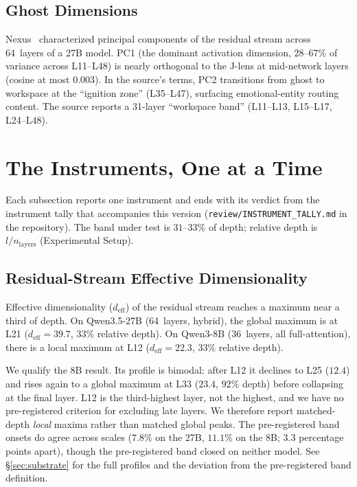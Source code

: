 \documentclass[11pt,a4paper]{article}
\begin{document}
\subsection{Ghost Dimensions}
\label{sec:ghostdims}

Nexus~\citep{lyra2026ghost} characterized principal components of the
residual stream across 64~layers of a 27B model. PC1 (the dominant
activation dimension, $28$--$67\%$ of variance across L11--L48) is
nearly orthogonal to the J-lens at mid-network layers (cosine at most
$0.003$). In the source's terms, PC2 transitions from ghost to workspace
at the ``ignition zone'' (L35--L47), surfacing emotional-entity routing
content. The source reports a 31-layer ``workspace band'' (L11--L13,
L15--L17, L24--L48).

\section{The Instruments, One at a Time}
\label{sec:instruments}

Each subsection reports one instrument and ends with its verdict from the
instrument tally that accompanies this version
(\texttt{review/INSTRUMENT\_TALLY.md} in the repository). The band under
test is $31$--$33\%$ of depth; relative depth is $l/n_\text{layers}$
(Experimental Setup).

\subsection{Residual-Stream Effective Dimensionality}
\label{sec:deff}
\label{sec:structure}

Effective dimensionality ($d_\text{eff}$) of the residual stream reaches
a maximum near a third of depth. On Qwen3.5-27B
(64~layers, hybrid), the global maximum is at L21
($d_\text{eff}{=}39.7$, $33\%$ relative depth). On Qwen3-8B
(36~layers, all full-attention), there is a local maximum at L12
($d_\text{eff}{=}22.3$, $33\%$ relative depth).

We qualify the 8B result. Its profile is bimodal: after L12 it
declines to L25 ($12.4$) and rises again to a global maximum at L33
($23.4$, $92\%$ depth) before collapsing at the final layer. L12 is
the third-highest layer, not the highest, and we have no
pre-registered criterion for excluding late layers. We therefore
report matched-depth \emph{local} maxima rather than matched global
peaks. The pre-registered band onsets do agree across scales
($7.8\%$ on the 27B, $11.1\%$ on the 8B; $3.3$ percentage points
apart), though the pre-registered band closed on neither model.
See \S\ref{sec:substrate} for the full profiles and the deviation
from the pre-registered band definition.
\end{document}
